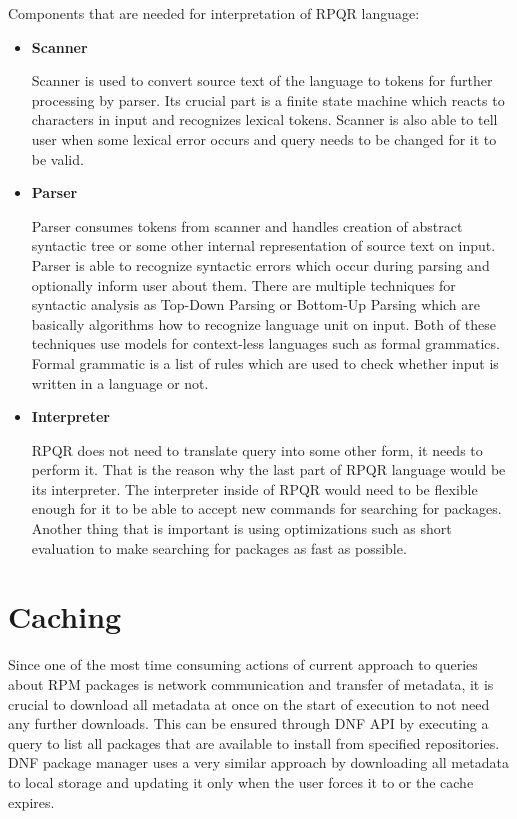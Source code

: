 Components that are needed for interpretation of RPQR language:
\begin{itemize}
  \item \textbf{Scanner}

  Scanner is used to convert source text of the language to tokens for further processing by parser.
  Its crucial part is a finite state machine which reacts to characters in input and recognizes lexical
  tokens. Scanner is also able to tell user when some lexical error occurs and query needs to be
  changed for it to be valid.
  
  \item \textbf{Parser}
  
  Parser consumes tokens from scanner and handles creation of abstract syntactic tree or some other
  internal representation of source text on input. Parser is able to recognize syntactic errors
  which occur during parsing and optionally inform user about them. There are multiple techniques
  for syntactic analysis as Top-Down Parsing or Bottom-Up Parsing which are basically algorithms
  how to recognize language unit on input. Both of these techniques use models for context-less
  languages such as formal grammatics. Formal grammatic is a list of rules which are used to check
  whether input is written in a language or not.

  \item \textbf{Interpreter}
  
  RPQR does not need to translate query into some other form, it needs to perform it. That is the
  reason why the last part of RPQR language would be its interpreter. The interpreter inside of RPQR would need to be
  flexible enough for it to be able to accept new commands for searching for packages. Another thing
  that is important is using optimizations such as short evaluation to make searching for packages
  as fast as possible.
\end{itemize}

\section{Caching}
Since one of the most time consuming actions of current approach to queries about RPM packages is
network communication and transfer of metadata, it is crucial to download all metadata at once on
the start of execution to not need any further downloads. This can be ensured through DNF API by
executing a query to list all packages that are available to install from specified repositories.
DNF package manager uses a very similar approach by downloading all metadata to local storage and
updating it only when the user forces it to or the cache expires.


